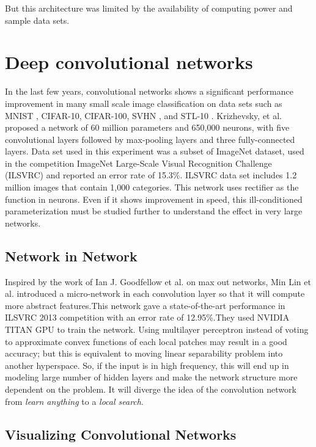 \documentclass{article}
\begin{document}
But this architecture was limited by the availability of computing power and  sample data sets. 

\section {Deep convolutional networks}
In the last few years, convolutional networks shows a significant performance improvement in many small scale image classification on data sets  such as MNIST \cite{Ciresan:2012g}, CIFAR-10, CIFAR-100, SVHN \cite{lee2014deeply}, and STL-10 \cite{deepfwd}. Krizhevsky, et al. \cite{Krizhevsky2012a} proposed a network  of 60 million parameters and 650,000 neurons, with five convolutional layers followed by max-pooling layers and three fully-connected layers. Data set used in this experiment was a subset of ImageNet dataset, used in the competition ImageNet Large-Scale Visual Recognition Challenge (ILSVRC) \cite{imagenet} and reported an error rate of 15.3\%. ILSVRC data set includes 1.2 million images that contain 1,000 categories. This network uses rectifier  as the function in neurons.  Even if it shows improvement in speed, this  ill-conditioned parameterization must be studied further to understand the effect in very large networks.



\subsection{Network in Network }
Inspired by the work of Ian J. Goodfellow et al.\cite{Goodfellow2013} on max out networks,  Min Lin et al. \cite{Lin2013} introduced a micro-network in each convolution layer so that it will compute more abstract features.This network gave a state-of-the-art performance in  ILSVRC 2013 competition with an error rate of 12.95\%.They used NVIDIA TITAN GPU to train the network. Using multilayer perceptron instead of voting to approximate convex functions of each  local patches may result in a good accuracy; but this is equivalent to moving linear separability problem into another hyperspace. So, if the input is in high frequency, this will end up in modeling large number of hidden layers and make the network structure more dependent on the problem. It will diverge the idea of the convolution network from \emph{learn anything} to a \emph{local search}.

\subsection{Visualizing Convolutional Networks}
\end{document}
